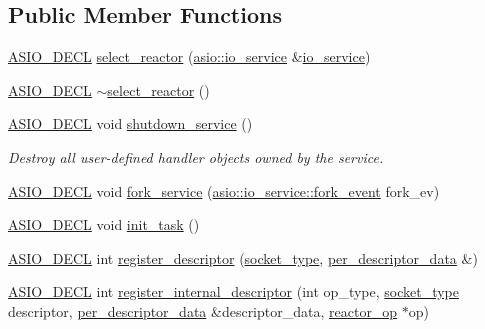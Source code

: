 \subsection*{Public Member Functions}
\begin{DoxyCompactItemize}
\item 
\hyperlink{config_8hpp_ab54d01ea04afeb9a8b39cfac467656b7}{A\+S\+I\+O\+\_\+\+D\+E\+C\+L} \hyperlink{classasio_1_1detail_1_1select__reactor_a715584458d9991b53be5a38c9f7ac714}{select\+\_\+reactor} (\hyperlink{classasio_1_1io__service}{asio\+::io\+\_\+service} \&\hyperlink{classasio_1_1io__service}{io\+\_\+service})
\item 
\hyperlink{config_8hpp_ab54d01ea04afeb9a8b39cfac467656b7}{A\+S\+I\+O\+\_\+\+D\+E\+C\+L} \hyperlink{classasio_1_1detail_1_1select__reactor_ae16c8e9c3279eecdba814d8e31297c7e}{$\sim$select\+\_\+reactor} ()
\item 
\hyperlink{config_8hpp_ab54d01ea04afeb9a8b39cfac467656b7}{A\+S\+I\+O\+\_\+\+D\+E\+C\+L} void \hyperlink{classasio_1_1detail_1_1select__reactor_a7167186a2d11da718454ec79742bd8fb}{shutdown\+\_\+service} ()
\begin{DoxyCompactList}\small\item\em Destroy all user-\/defined handler objects owned by the service. \end{DoxyCompactList}\item 
\hyperlink{config_8hpp_ab54d01ea04afeb9a8b39cfac467656b7}{A\+S\+I\+O\+\_\+\+D\+E\+C\+L} void \hyperlink{classasio_1_1detail_1_1select__reactor_ac891c6cc7ddd0bdc5917d03e083e0569}{fork\+\_\+service} (\hyperlink{classasio_1_1io__service_a45f084ae64e601f7ead3f891d5ed0fc6}{asio\+::io\+\_\+service\+::fork\+\_\+event} fork\+\_\+ev)
\item 
\hyperlink{config_8hpp_ab54d01ea04afeb9a8b39cfac467656b7}{A\+S\+I\+O\+\_\+\+D\+E\+C\+L} void \hyperlink{classasio_1_1detail_1_1select__reactor_a9501a75f82bcb0c4438d1c774cd17366}{init\+\_\+task} ()
\item 
\hyperlink{config_8hpp_ab54d01ea04afeb9a8b39cfac467656b7}{A\+S\+I\+O\+\_\+\+D\+E\+C\+L} int \hyperlink{classasio_1_1detail_1_1select__reactor_a40cbe8f146bdff27ea23f48069fc62ef}{register\+\_\+descriptor} (\hyperlink{namespaceasio_1_1detail_a6798c771dd84b79798b1a08150706ea9}{socket\+\_\+type}, \hyperlink{structasio_1_1detail_1_1select__reactor_1_1per__descriptor__data}{per\+\_\+descriptor\+\_\+data} \&)
\item 
\hyperlink{config_8hpp_ab54d01ea04afeb9a8b39cfac467656b7}{A\+S\+I\+O\+\_\+\+D\+E\+C\+L} int \hyperlink{classasio_1_1detail_1_1select__reactor_a6593fb666eb1aac45e56f87cd7e59d91}{register\+\_\+internal\+\_\+descriptor} (int op\+\_\+type, \hyperlink{namespaceasio_1_1detail_a6798c771dd84b79798b1a08150706ea9}{socket\+\_\+type} descriptor, \hyperlink{structasio_1_1detail_1_1select__reactor_1_1per__descriptor__data}{per\+\_\+descriptor\+\_\+data} \&descriptor\+\_\+data, \hyperlink{classasio_1_1detail_1_1reactor__op}{reactor\+\_\+op} $\ast$op)

\end{DoxyCompactItemize}
